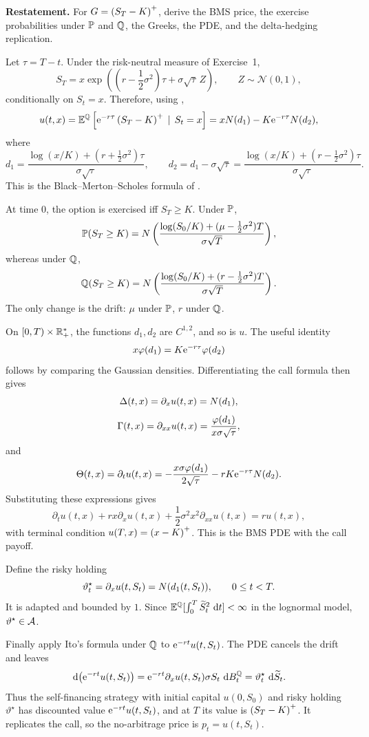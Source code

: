 \begin{exercise}
\textbf{Restatement.}
For \(G=\pos{S_T-K}\), derive the BMS price, the exercise probabilities under
\(\P\) and \(\Q\), the Greeks, the PDE, and the delta-hedging replication.

\begin{solution}
Let \(\tau=T-t\).  Under the risk-neutral measure of Exercise~1,
\[
  S_T=x\exp\left(\left(r-\frac12\sigma^2\right)\tau
       +\sigma\sqrt{\tau}\,Z\right),
  \qquad Z\sim\mathcal N(0,1),
\]
conditionally on \(S_t=x\).  Therefore, using ,
\[
  u(t,x)=\EQ\left[\e^{-r\tau}\pos{S_T-K}\,\mid\, S_t=x\right]
        =x\normalcdf(d_1)-K\e^{-r\tau}\normalcdf(d_2),
\]
where
\[
  d_1=\frac{\log(x/K)+(r+\frac12\sigma^2)\tau}{\sigma\sqrt{\tau}},
  \qquad
  d_2=d_1-\sigma\sqrt{\tau}
     =\frac{\log(x/K)+(r-\frac12\sigma^2)\tau}{\sigma\sqrt{\tau}}.
\]
This is the Black--Merton--Scholes formula of .

At time \(0\), the option is exercised iff \(S_T\ge K\).  Under \(\P\),
\[
  \P(S_T\ge K)
    =\normalcdf\left(
       \frac{\log(S_0/K)+(\mu-\frac12\sigma^2)T}{\sigma\sqrt T}
     \right),
\]
whereas under \(\Q\),
\[
  \Q(S_T\ge K)
    =\normalcdf\left(
       \frac{\log(S_0/K)+(r-\frac12\sigma^2)T}{\sigma\sqrt T}
     \right).
\]
The only change is the drift: \(\mu\) under \(\P\), \(r\) under \(\Q\).

On \([0,T)\times\R_+^*\), the functions \(d_1,d_2\) are \(C^{1,2}\), and so is
\(u\).  The useful identity
\[
  x\normalpdf(d_1)=K\e^{-r\tau}\normalpdf(d_2)
\]
follows by comparing the Gaussian densities.  Differentiating the call formula
then gives
\[
  \Delta(t,x)=\partial_xu(t,x)=\normalcdf(d_1),
\]
\[
  \Gamma(t,x)=\partial_{xx}u(t,x)
    =\frac{\normalpdf(d_1)}{x\sigma\sqrt{\tau}},
\]
and
\[
  \Theta(t,x)=\partial_tu(t,x)
    =-\frac{x\sigma\normalpdf(d_1)}{2\sqrt{\tau}}
     -rK\e^{-r\tau}\normalcdf(d_2).
\]
Substituting these expressions gives
\[
  \partial_tu(t,x)+rx\partial_xu(t,x)
    +\frac12\sigma^2x^2\partial_{xx}u(t,x)=ru(t,x),
\]
with terminal condition \(u(T,x)=\pos{x-K}\).  This is the BMS PDE
 with the call payoff.

Define the risky holding
\[
  \vartheta_t^\star=\partial_xu(t,S_t)=\normalcdf(d_1(t,S_t)),
  \qquad 0\le t<T.
\]
It is adapted and bounded by \(1\).  Since \(\EQ[\int_0^T\Stilde_t^2\,\dd t]<\infty\)
in the lognormal model, \(\vartheta^\star\in\A\).

Finally apply Ito's formula under \(\Q\) to \(\e^{-rt}u(t,S_t)\).  The PDE
cancels the drift and leaves
\[
  \dd\bigl(\e^{-rt}u(t,S_t)\bigr)
    =\e^{-rt}\partial_xu(t,S_t)\sigma S_t\,\dd B_t^\Q
    =\vartheta_t^\star\,\dd\Stilde_t.
\]
Thus the self-financing strategy with initial capital \(u(0,S_0)\) and risky
holding \(\vartheta^\star\) has discounted value \(\e^{-rt}u(t,S_t)\), and at
\(T\) its value is \(\pos{S_T-K}\).  It replicates the call, so the no-arbitrage
price is \(p_t=u(t,S_t)\).
\end{solution}
\end{exercise}
